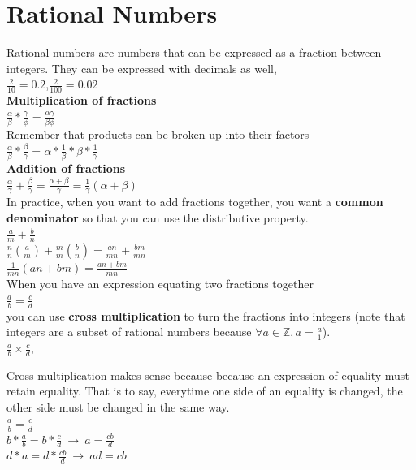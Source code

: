\documentclass[12pt]{report}
\begin{document}
\section{Rational Numbers}
Rational numbers are numbers that can be expressed as a fraction between integers. They can be expressed with decimals as well,\medskip\\
$\frac{2}{10} = 0.2$,\hspace{10pt}$\frac{2}{100} = 0.02$\medskip\\
\textbf{Multiplication of fractions}\medskip\\
{$\frac{\alpha}{\beta}*\frac{\gamma}{\phi}=\frac{\alpha \gamma}{\beta \phi}$}\hspace{30pt}{$\frac{\alpha}{\beta}*\frac{\beta}{\gamma}=\frac{\alpha}{\gamma}$}\medskip\\
Remember that products can be broken up into their factors\medskip\\
$\frac{\alpha}{\beta}*\frac{\beta}{\gamma}= \alpha * \frac{1}{\beta} * \beta * \frac{1}{\gamma}$\medskip\\
\textbf{Addition of fractions}\medskip\\
{$\frac{\alpha}{\gamma}+\frac{\beta}{\gamma}=\frac{\alpha + \beta}{\gamma}=\frac{1}{\gamma}(\alpha + \beta)$}\medskip\\
In practice, when you want to add fractions together, you want a \textbf{common denominator} so that you can use the distributive property.\medskip\\
$\frac{a}{m} + \frac{b}{n}$\smallskip\\
$\frac{n}{n}(\frac{a}{m}) + \frac{m}{m}(\frac{b}{n})=\frac{an}{mn}+\frac{bm}{mn}$\medskip\\
$\frac{1}{mn}(an + bm)=\frac{an+bm}{mn}$\medskip\\
When you have an expression equating two fractions together\\
$\frac{a}{b} = \frac{c}{d}$\smallskip\\
you can use \textbf{cross multiplication} to turn the fractions into integers (note that integers are a subset of rational numbers because $\forall a \in \mathbb{Z}, a=\frac{a}{1}$).\smallskip\\
$\frac{a}{b} \times \frac{c}{d}$,

Cross multiplication makes sense because because an expression of equality must retain equality. That is to say, everytime one side of an equality is changed, the other side must be changed in the same way.\smallskip\\
$\frac{a}{b}=\frac{c}{d}$\smallskip\\
$b*\frac{a}{b}=b*\frac{c}{d}~\rightarrow~a=\frac{cb}{d}$\smallskip\\
$d*a=d*\frac{cb}{d}~\rightarrow~ad=cb$\bigskip
\end{document}
